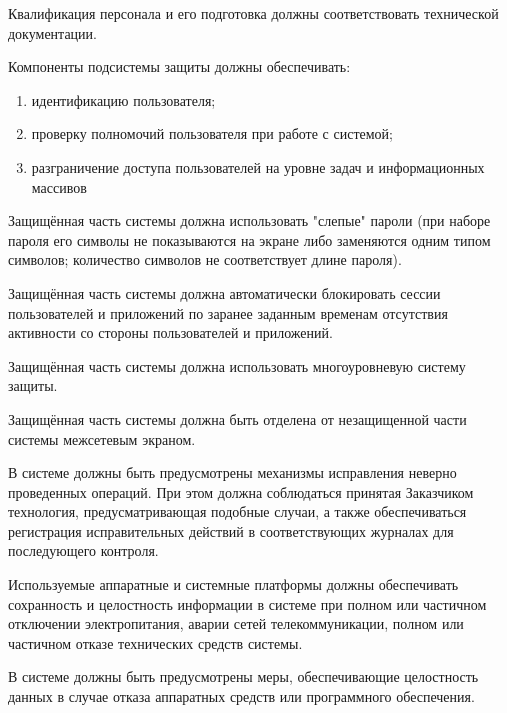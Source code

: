 \documentclass[russian, utf8, 12pt,pointsubsection,floatsubsection]{eskdtext}
\begin{document}
Квалификация персонала и его подготовка должны соответствовать технической документации.



Компоненты подсистемы защиты должны обеспечивать:
\begin{enumerate}
    \item идентификацию пользователя;
\item проверку полномочий пользователя при работе с системой;
\item разграничение доступа пользователей на уровне задач и информационных массивов
\end{enumerate}

Защищённая часть системы должна использовать "слепые" пароли (при наборе пароля его символы не показываются на экране либо заменяются одним типом символов; количество символов не соответствует длине пароля).

Защищённая часть системы должна автоматически блокировать сессии пользователей и приложений по заранее заданным временам отсутствия активности со стороны пользователей и приложений.

Защищённая часть системы должна использовать многоуровневую систему защиты.

Защищённая часть системы должна быть отделена от незащищенной части системы межсетевым экраном.

В системе должны быть предусмотрены механизмы исправления неверно проведенных операций. При этом должна соблюдаться принятая Заказчиком технология, предусматривающая подобные случаи, а также обеспечиваться регистрация исправительных действий в соответствующих журналах для последующего контроля.



Используемые аппаратные и системные платформы должны обеспечивать сохранность и целостность информации в системе при полном или частичном отключении электропитания, аварии сетей телекоммуникации, полном или частичном отказе технических средств системы.

В системе должны быть предусмотрены меры, обеспечивающие целостность данных в случае отказа аппаратных средств или программного обеспечения.
\end{document}
